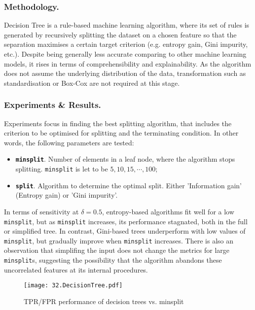 \subsubsection{Methodology.}
Decision Tree is a rule-based machine learning algorithm, where its set of rules is generated by recursively splitting the dataset on a chosen feature so that the separation maximises a certain target criterion (e.g. entropy gain, Gini impurity, etc.). Despite being generally less accurate comparing to other machine learning models, it rises in terms of comprehensibility and explainability. As the algorithm does not assume the underlying distribution of the data, transformation such as standardisation or Box-Cox are not required at this stage.

\subsubsection{Experiments \& Results.}
Experiments focus in finding the best splitting algorithm, that includes the criterion to be optimised for splitting and the terminating condition. In other words, the following parameters are tested:

\begin{itemize}
    \item \textbf{\texttt{minsplit}}. Number of elements in a leaf node, where the algorithm stops splitting. \texttt{minsplit} is let to be \( 5, 10, 15, \cdots, 100 \);
    \item \textbf{\texttt{split}}. Algorithm to determine the optimal split. Either 'Information gain' (Entropy gain) or 'Gini impurity'.
\end{itemize}

In terms of sensitivity at \( \delta = 0.5 \), entropy-based algorithms fit well for a low \texttt{minsplit}, but as \texttt{minsplit} increases, its performance stagnated, both in the full or simplified tree. In contrast, Gini-based trees underperform with low values of \texttt{minsplit}, but gradually improve when \texttt{minsplit} increases. There is also an observation that simplifing the input does not change the metrics for large \texttt{minsplit}s, suggesting the possibility that the algorithm abandons these uncorrelated features at its internal procedures.

\begin{figure}[h]
    \centering
    \texttt{[image: 32.DecisionTree.pdf]}
    \caption{\centering TPR/FPR performance of decision trees vs. minsplit}
\end{figure}


